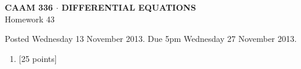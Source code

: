 \documentclass[10pt]{article}
\begin{document}
\vspace*{-5em}
\begin{center}
\large \textsf{\textbf{CAAM 336 $\cdot$ DIFFERENTIAL EQUATIONS}\\[0.5em]
Homework 43 }
\end{center}

Posted Wednesday 13 November 2013.  Due 5pm Wednesday 27 November 2013.

\begin{enumerate}\addtocounter{enumi}{42}
\item {[25 points]}  
\end{enumerate}
\end{document}
